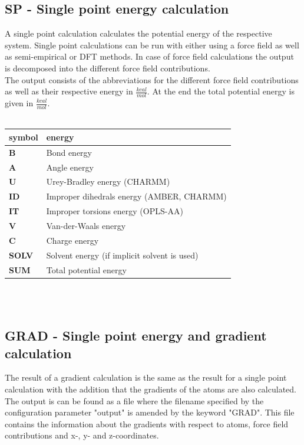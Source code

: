 \documentclass[10pt,a4paper]{article} %
\begin{document}
	\subsection{SP - Single point energy calculation}
	A single point calculation calculates the potential energy of the respective system. Single point calculations can be run with either using a force field as well as semi-empirical or \ac{DFT} methods. In case of force field calculations the output is decomposed into the different force field contributions.\\

	The output consists of the abbreviations for the different force field contributions as well as their respective energy in $\frac{kcal}{mol}$. At the end the total potential energy is given in $\frac{kcal}{mol}$.\\~\\

	\begin{tabularx}{\textwidth}{l|l}
		symbol & energy\\
		\hline
		\textbf{B} & Bond energy\\
		\textbf{A} & Angle energy\\
		\textbf{U} & Urey-Bradley energy (\ac{CHARMM})\\
		\textbf{ID} & Improper dihedrals energy (\ac{AMBER}, \ac{CHARMM})\\
		\textbf{IT} & Improper torsions energy (\ac{OPLS-AA})\\
		\textbf{V} & Van-der-Waals energy\\
		\textbf{C} & Charge energy\\
		\textbf{SOLV} & Solvent energy (if implicit solvent is used)\\
		\textbf{SUM} & Total potential energy\\

	\end{tabularx}\\~\\


	\subsection{GRAD - Single point energy and gradient calculation}
	The result of a gradient calculation is the same as the result for a single point calculation with the addition that the gradients of the atoms are also calculated. The output is can be found as a file where the filename specified by the configuration parameter "output" is amended by the keyword "GRAD". This file contains the information about the gradients with respect to atoms, force field contributions and x-, y- and z-coordinates.
\end{document}
